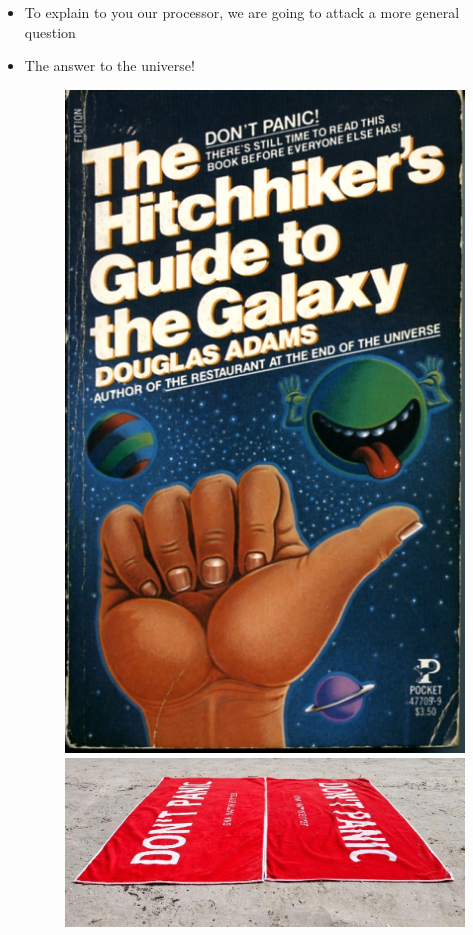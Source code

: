 \documentclass{beamer}
\begin{document}
\begin{frame}
\begin{itemize}
\item To explain to you our processor, we are going to attack a more general
question 
\pause
\item The answer to the universe!
\begin{figure}
\center
\includegraphics[scale=0.2]{hitch.jpg}
\includegraphics[scale=0.5]{panic.jpg}
\end{figure}
\end{itemize}
\end{frame}
\end{document}
